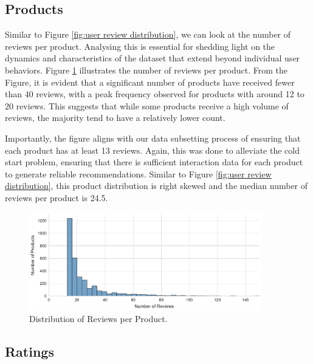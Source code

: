 \subsection{Products}
\label{subsec:3 Products}

Similar to Figure \ref{fig:user review distribution}, we can look at the number of reviews per product. Analysing this is essential for shedding light on the dynamics and characteristics of the dataset that extend beyond individual user behaviors. Figure \ref{fig:product review distribution} illustrates the number of reviews per product. From the Figure, it is evident that a significant number of products have received fewer than 40 reviews, with a peak frequency observed for products with around 12 to 20 reviews. This suggests that while some products receive a high volume of reviews, the majority tend to have a relatively lower count.

Importantly, the figure aligns with our data subsetting process of ensuring that each product has at least 13 reviews. Again, this was done to alleviate the cold start problem, ensuring that there is sufficient interaction data for each product to generate reliable recommendations. Similar to Figure \ref{fig:user review distribution}, this product distribution is right skewed and the median number of reviews per product is 24.5. 

\begin{figure}[h]
  \centering
  \includegraphics[width=0.9\textwidth]{Figures/reviews_per_product_distribution.pdf} %
  \caption{Distribution of Reviews per Product.}
  \label{fig:product review distribution}
\end{figure}


\subsection{Ratings}
\label{subsec:3 Ratings}

